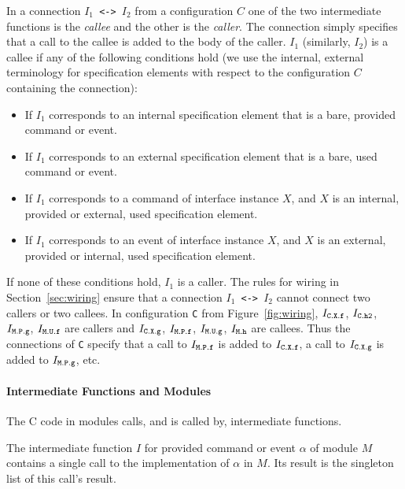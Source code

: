 \documentclass[11pt,letterpaper]{article}
\newcommand{\code}[1]{{\tt #1}}
\begin{document}
In a connection \code{$I_1$ <-> $I_2$} from a configuration
$C$ one of the two intermediate functions is the \emph{callee} and the
other is the \emph{caller}. The connection simply specifies that a call to
the callee is added to the body of the caller. \code{$I_1$}
(similarly, \code{$I_2$}) is a callee if any of the following conditions hold
(we use the internal, external terminology for specification elements with
respect to the configuration $C$ containing the connection):
\begin{itemize}
\item If \code{$I_1$} corresponds to an internal specification element that
is a bare, provided command or event.
\item If \code{$I_1$} corresponds to an external specification element that
is a bare, used command or event.
\item If \code{$I_1$} corresponds to a command of interface instance $X$,
and $X$ is an internal, provided or external, used specification element.
\item If \code{$I_1$} corresponds to an event of interface instance $X$,
and $X$ is an external, provided or internal, used specification element.
\end{itemize}
If none of these conditions hold, \code{$I_1$} is a caller. The rules for
wiring in Section~\ref{sec:wiring} ensure that a connection \code{$I_1$ <->
$I_2$} cannot connect two callers or two callees. In configuration \code{C}
from Figure~\ref{fig:wiring}, $I_\code{C.X.f}$, $I_\code{C.h2}$,
$I_\code{M.P.g}$, $I_\code{M.U.f}$ are callers and $I_\code{C.X.g}$,
$I_\code{M.P.f}$, $I_\code{M.U.g}$, $I_\code{M.h}$ are callees. Thus the
connections of \code{C} specify that a call to $I_\code{M.P.f}$ is added to
$I_\code{C.X.f}$, a call to $I_\code{C.X.g}$ is added to $I_\code{M.P.g}$,
etc.


\paragraph{Intermediate Functions and Modules}

The C code in modules calls, and is called by, intermediate functions. 

The intermediate function $I$ for provided command or event $\alpha$ of
module $M$ contains a single call to the implementation of $\alpha$ in
$M$. Its result is the singleton list of this call's result.
\end{document}
